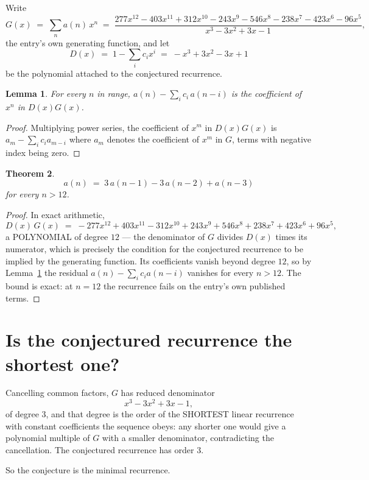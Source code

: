 \documentclass[11pt,a4paper]{article}
\theoremstyle{plain}
\newtheorem{theorem}{Theorem}
\newtheorem{lemma}[theorem]{Lemma}
\theoremstyle{definition}
\begin{document}
Write
\[
G(x)\;=\;\sum_{n}a(n)\,x^{n}\;=\;\frac{277 x^{12} - 403 x^{11} + 312 x^{10} - 243 x^{9} - 546 x^{8} - 238 x^{7} - 423 x^{6} - 96 x^{5}}{x^{3} - 3 x^{2} + 3 x - 1},
\]
the entry's own generating function, and let
\[
D(x)\;=\;1-\sum_i c_i x^{i}\;=\;- x^{3} + 3 x^{2} - 3 x + 1
\]
be the polynomial attached to the conjectured recurrence.

\begin{lemma}\label{lem:key}
For every $n$ in range, $a(n)-\sum_i c_i\,a(n-i)$ is the coefficient of $x^{n}$ in
$D(x)G(x)$.
\end{lemma}

\begin{proof}
Multiplying power series, the coefficient of $x^{m}$ in $D(x)G(x)$ is
$a_m-\sum_i c_i a_{m-i}$ where $a_m$ denotes the coefficient of $x^{m}$ in $G$, terms with
negative index being zero.
\end{proof}

\begin{theorem}
\[
a(n)\;=\;3\,a(n-1) - 3\,a(n-2) + a(n-3)
\]
for every $n>12$.
\end{theorem}

\begin{proof}
In exact arithmetic,
\[
D(x)\,G(x)\;=\;- 277 x^{12} + 403 x^{11} - 312 x^{10} + 243 x^{9} + 546 x^{8} + 238 x^{7} + 423 x^{6} + 96 x^{5},
\]
a POLYNOMIAL of degree $12$ --- the denominator of $G$ divides $D(x)$ times its numerator,
which is precisely the condition for the conjectured recurrence to be implied by the
generating function. Its coefficients vanish beyond degree $12$, so by
Lemma~\ref{lem:key} the residual $a(n)-\sum_ic_ia(n-i)$ vanishes for every
$n>12$. The bound is exact: at $n=12$ the recurrence fails on the entry's own published terms.
\end{proof}

\section{Is the conjectured recurrence the shortest one?}

Cancelling common factors, $G$ has reduced denominator
\[
x^{3} - 3 x^{2} + 3 x - 1,
\]
of degree $3$, and that degree is the order of the SHORTEST linear recurrence with
constant coefficients the sequence obeys: any shorter one would give a polynomial multiple of
$G$ with a smaller denominator, contradicting the cancellation. The conjectured recurrence has
order $3$.

So the conjecture is the minimal recurrence.
\end{document}
